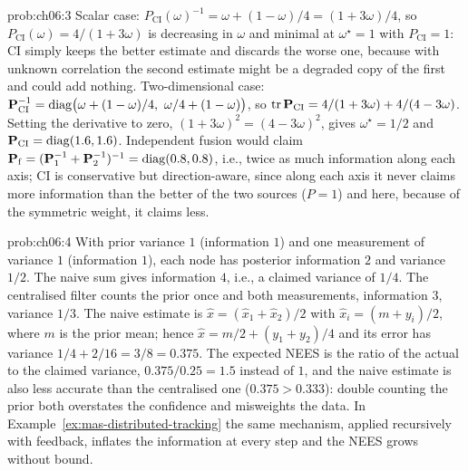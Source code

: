 \begin{sol}{prob:ch06:3}
Scalar case: $P_{\mathrm{CI}}(\omega)^{-1}=\omega+(1-\omega)/4=(1+3\omega)/4$, so $P_{\mathrm{CI}}(\omega)=4/(1+3\omega)$ is decreasing in $\omega$ and minimal at $\omega^{\star}=1$ with $P_{\mathrm{CI}}=1$: CI simply keeps the better estimate and discards the worse one, because with unknown correlation the second estimate might be a degraded copy of the first and could add nothing. Two-dimensional case: $\mathbf{P}_{\mathrm{CI}}^{-1}=\diag\!\big(\omega+(1-\omega)/4,\ \omega/4+(1-\omega)\big)$, so $\operatorname{tr}\mathbf{P}_{\mathrm{CI}}=4/(1+3\omega)+4/(4-3\omega)$. Setting the derivative to zero, $(1+3\omega)^{2}=(4-3\omega)^{2}$, gives $\omega^{\star}=1/2$ and $\mathbf{P}_{\mathrm{CI}}=\operatorname{diag}(1.6,1.6)$. Independent fusion would claim $\mathbf{P}_{\mathrm{f}}=(\mathbf{P}_1^{-1}+\mathbf{P}_2^{-1})^{-1}=\operatorname{diag}(0.8,0.8)$, i.e., twice as much information along each axis; CI is conservative but direction-aware, since along each axis it never claims more information than the better of the two sources ($P=1$) and here, because of the symmetric weight, it claims less.
\end{sol}

\begin{sol}{prob:ch06:4}
With prior variance $1$ (information $1$) and one measurement of variance $1$ (information $1$), each node has posterior information $2$ and variance $1/2$. The naive sum gives information $4$, i.e., a claimed variance of $1/4$. The centralised filter counts the prior once and both measurements, information $3$, variance $1/3$. The naive estimate is $\widehat{x}=(\widehat{x}_1+\widehat{x}_2)/2$ with $\widehat{x}_i=(m+y_i)/2$, where $m$ is the prior mean; hence $\widehat{x}=m/2+(y_1+y_2)/4$ and its error has variance $1/4+2/16=3/8=0.375$. The expected NEES is the ratio of the actual to the claimed variance, $0.375/0.25=1.5$ instead of $1$, and the naive estimate is also less accurate than the centralised one ($0.375>0.333$): double counting the prior both overstates the confidence and misweights the data. In Example~\ref{ex:mas-distributed-tracking} the same mechanism, applied recursively with feedback, inflates the information at every step and the NEES grows without bound.
\end{sol}


